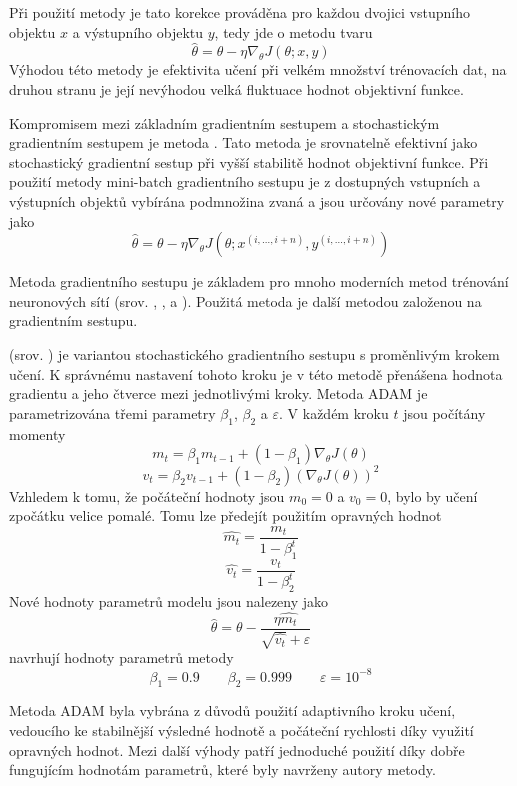 Při použití metody  je tato korekce prováděna pro každou dvojici vstupního objektu \( x \) a výstupního objektu \( y \), tedy jde o metodu tvaru
\[ \hat \theta = \theta - \eta \nabla_{\theta} J \left( \theta; x, y \right) \]
Výhodou této metody je efektivita učení při velkém množství trénovacích dat, na druhou stranu je její nevýhodou velká fluktuace hodnot objektivní funkce.

Kompromisem mezi základním gradientním sestupem a stochastickým gradientním sestupem je metoda . Tato metoda je srovnatelně efektivní jako stochastický gradientní sestup při vyšší stabilitě hodnot objektivní funkce. Při použití metody mini-batch gradientního sestupu je z dostupných vstupních a výstupních objektů vybírána podmnožina zvaná  a jsou určovány nové parametry jako
\[ \hat \theta = \theta - \eta \nabla_{\theta} J \left( \theta; x^{\left( i, \dots, i + n \right)}, y^{\left( i, \dots, i + n \right)} \right) \]

Metoda gradientního sestupu je základem pro mnoho moderních metod trénování neuronových sítí (srov. \cite{duchi_adaptive_2011}, \cite{zeiler_adadelta:_2012}, \cite{tieleman_lecture_2012} a \cite{kingma_adam:_2014}). Použitá metoda je další metodou založenou na gradientním sestupu.

 (srov. \cite{kingma_adam:_2014}) je variantou stochastického gradientního sestupu s proměnlivým krokem učení. K správnému nastavení tohoto kroku je v této metodě přenášena hodnota gradientu a jeho čtverce mezi jednotlivými kroky. Metoda ADAM je parametrizována třemi parametry \( \beta_1 \), \( \beta_2 \) a \( \varepsilon \). V každém kroku \( t \) jsou počítány momenty
\[ m_t = \beta_1 m_{t - 1} + \left( 1 - \beta_1 \right) \nabla_{\theta} J \left( \theta \right) \]
\[ v_t = \beta_2 v_{t - 1} + \left( 1 - \beta_2 \right) \left( \nabla_{\theta} J \left( \theta \right) \right)^2 \]
Vzhledem k tomu, že počáteční hodnoty jsou \( m_0 = 0 \) a \( v_0 = 0 \), bylo by učení zpočátku velice pomalé. Tomu lze předejít použitím opravných hodnot
\[ \hat{m_t} = \frac{m_t}{1 - \beta_1^t} \]
\[ \hat{v_t} = \frac{v_t}{1 - \beta_2^t} \]
Nové hodnoty parametrů modelu jsou nalezeny jako
\[ \hat \theta = \theta - \frac{\eta \hat{m_t}}{\sqrt{\hat{v_t}} + \varepsilon} \]
\cite{kingma_adam:_2014} navrhují hodnoty parametrů metody
\[ \beta_1 = 0.9 \qquad \beta_2 = 0.999 \qquad \varepsilon = 10^{-8} \]

Metoda ADAM byla vybrána z důvodů použití adaptivního kroku učení, vedoucího ke stabilnější výsledné hodnotě a počáteční rychlosti díky využití opravných hodnot. Mezi další výhody patří jednoduché použití díky dobře fungujícím hodnotám parametrů, které byly navrženy autory metody.
